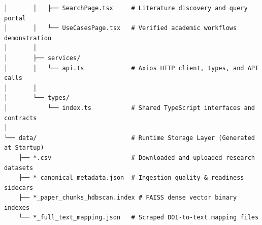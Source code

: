 \begin{lstlisting}[caption={Annotated Research Rover Project Tree}]
│       │   ├── SearchPage.tsx     # Literature discovery and query portal
│       │   └── UseCasesPage.tsx   # Verified academic workflows demonstration
│       │
│       ├── services/
│       │   └── api.ts             # Axios HTTP client, types, and API calls
│       │
│       └── types/
│           └── index.ts           # Shared TypeScript interfaces and contracts
│
└── data/                          # Runtime Storage Layer (Generated at Startup)
    ├── *.csv                      # Downloaded and uploaded research datasets
    ├── *_canonical_metadata.json  # Ingestion quality & readiness sidecars
    ├── *_paper_chunks_hdbscan.index # FAISS dense vector binary indexes
    └── *_full_text_mapping.json   # Scraped DOI-to-text mapping files
\end{lstlisting}
